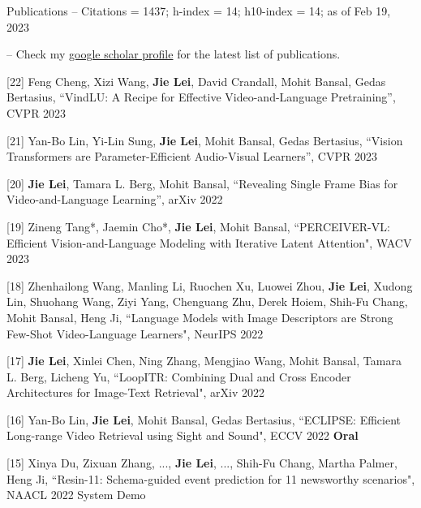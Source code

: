 \documentclass{resume} %
\begin{document}

\begin{rSection}{Publications}       
    -- Citations = 1437; h-index = 14; h10-index = 14; as of Feb 19, 2023

    -- Check my \href{https://scholar.google.com/citations?user=SZN9FLIAAAAJ&hl=en}{google scholar profile} for the latest list of publications.   
    
    
    \item {[22] 
    Feng Cheng, Xizi Wang, \textbf{Jie Lei}, David Crandall, Mohit Bansal, Gedas Bertasius,
    ``VindLU: A Recipe for Effective Video-and-Language Pretraining'',
     CVPR 2023
    }        
    \item {[21] 
    Yan-Bo Lin, Yi-Lin Sung, \textbf{Jie Lei}, Mohit Bansal, Gedas Bertasius,
    ``Vision Transformers are Parameter-Efficient Audio-Visual Learners'',
     CVPR 2023
    }       
    \item {[20] 
    \textbf{Jie Lei}, Tamara L. Berg, Mohit Bansal,
    ``Revealing Single Frame Bias for Video-and-Language Learning'',
     arXiv 2022
    }       
    \item {[19] 
    Zineng Tang*, Jaemin Cho*, \textbf{Jie Lei}, Mohit Bansal, 
    ``PERCEIVER-VL: Efficient Vision-and-Language Modeling with Iterative Latent Attention", 
    WACV 2023
    }        
    \item {[18] 
    Zhenhailong Wang, Manling Li, Ruochen Xu, Luowei Zhou,  \textbf{Jie Lei}, Xudong Lin, Shuohang Wang, Ziyi Yang, Chenguang Zhu, Derek Hoiem, Shih-Fu Chang, Mohit Bansal, Heng Ji,
    ``Language Models with Image Descriptors are Strong Few-Shot Video-Language Learners",
     NeurIPS 2022
    }      
    \item {[17] 
    \textbf{Jie Lei}, Xinlei Chen, Ning Zhang, Mengjiao Wang, Mohit Bansal, Tamara L. Berg, Licheng Yu,
    ``LoopITR: Combining Dual and Cross Encoder Architectures for Image-Text Retrieval", 
    arXiv 2022
    }             
    \item {[16] 
    Yan-Bo Lin, \textbf{Jie Lei}, Mohit Bansal, Gedas Bertasius,
    ``ECLIPSE: Efficient Long-range Video Retrieval using Sight and Sound",
     ECCV 2022 {\color{bittersweet}\textbf{Oral}} 
    }              

    \item {[15] 
    Xinya Du, Zixuan Zhang, ..., \textbf{Jie Lei}, ..., Shih-Fu Chang, Martha Palmer, Heng Ji,
    ``Resin-11: Schema-guided event prediction for 11 newsworthy scenarios",
     NAACL 2022 System Demo
    }       
    

\end{rSection}
\end{document}
